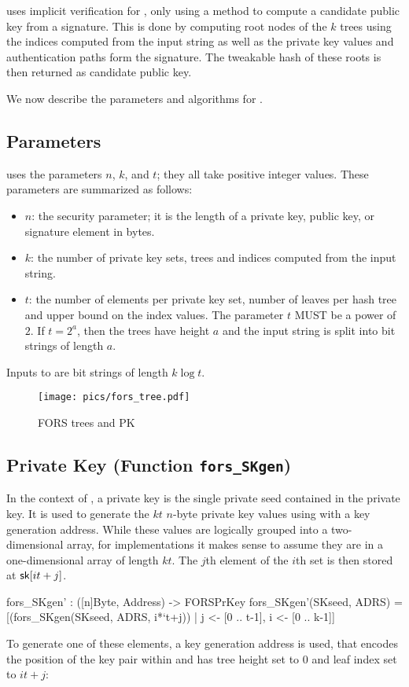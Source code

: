 \spx uses implicit verification for \fors, only using a method to compute
a candidate public key from a signature. This is done by computing root nodes 
of the $k$ trees using the indices computed from the input string as well as 
the private key values and authentication paths form the signature. The 
tweakable hash of these roots is then returned as candidate public key.

%
We now describe the parameters and algorithms for \fors.

\subsection{\fors Parameters}\label{sec:fors:params}
\fors uses the parameters $n$, $k$, and $t$; they all take positive integer 
values.
These parameters are summarized as follows:
\begin{itemize}
  \item $n$: the security parameter; it is the length of a private key, public 
  key, or signature element in bytes. 
  \item $k$: the number of private key sets, trees and indices computed 
  from the input string.
  \item $t$: the number of elements per private key set, number of leaves per 
  hash tree and upper bound on the index values. The parameter $t$ MUST 
  be a power of $2$. If $t = 2^a$, then the trees have height $a$ and the 
  input string is split into bit strings of length $a$.
\end{itemize}
Inputs to \fors are bit strings of length $k\log t$.

\begin{figure}[htb]
\texttt{[image: pics/fors\_tree.pdf]}
\caption{FORS trees and PK}
\end{figure}

\subsection{\fors Private Key (Function \texttt{fors\_SKgen})} 
In the context of \spx, a \fors private key is the single private seed \sseed
contained in the \spx private key. It is used to generate the $kt$ $n$-byte 
private key values using \sphincsPRF with a \fors key generation address. While these values are 
logically grouped into a two-dimensional array, for implementations it makes sense to assume they 
are in a one-dimensional array of length $kt$. 
The $j$th element of the $i$th set is then stored at $\mathsf{sk}[it + j]$. 
\begin{code}
  fors_SKgen' : ([n]Byte, Address) -> FORSPrKey
  fors_SKgen'(SKseed, ADRS) =
    [(fors_SKgen(SKseed, ADRS, i*`t+j)) | j <- [0 .. t-1], i <- [0 .. k-1]]
\end{code}
To generate one of these elements, a \fors key generation address \skadrs is used, that encodes the 
position of the \fors key pair within \spx and has 
tree height set to $0$ and leaf index set to $it+j$: 

